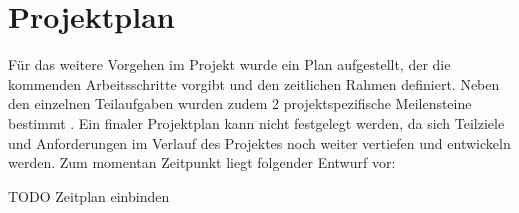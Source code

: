 
\section{Projektplan}
Für das weitere Vorgehen im Projekt wurde ein Plan aufgestellt, der die kommenden Arbeitsschritte vorgibt und den zeitlichen Rahmen definiert. Neben den einzelnen Teilaufgaben wurden zudem 2 projektspezifische Meilensteine bestimmt . Ein finaler Projektplan kann nicht festgelegt werden, da sich Teilziele und Anforderungen im Verlauf des Projektes noch weiter vertiefen und entwickeln werden. Zum momentan Zeitpunkt liegt folgender Entwurf vor:

TODO Zeitplan einbinden